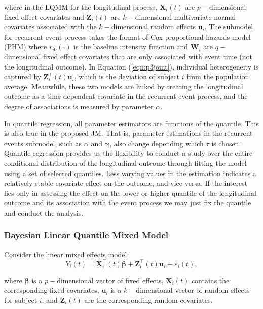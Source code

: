 \noindent where in the LQMM for the longitudinal process, $\boldsymbol{X}_{i}(t)$ are $p-$dimensional fixed effect covariates and $\boldsymbol{Z}_{i}(t)$ are $k-$dimensional multivariate normal covariates associated with the $k-$dimensional random effects $\boldsymbol{u}_i$. The submodel for recurrent event process takes the format of Cox proportional hazards model (PHM) where $r_{i0}(\cdot)$ is the baseline intensity function and $\boldsymbol{W}_{i}$ are $q-$dimensional fixed effect covariates that are only associated with event time (not the longitudinal outcome). In Equation (\ref{eqn:p3joint}), individual heterogeneity is captured by ${\boldsymbol Z}_{i}^{\top}(t){\boldsymbol u}_i$, which is the deviation of subject $i$ from the population average. Meanwhile, these two models are linked by treating the longitudinal outcome as a time dependent covariate in the recurrent event process, and the degree of associations is measured by parameter $\alpha$.

In quantile regression, all parameter estimators are functions of the quantile. This is also true in the proposed JM. That is, parameter estimations in the recurrent events submodel, such as $\alpha$ and $\boldsymbol{\gamma}$, also change depending which $\tau$ is chosen. Quantile regression provides us the flexibility to conduct a study over the entire conditional distribution of the longitudinal outcome through fitting the model using a set of selected quantiles. Less varying values in the estimation indicates a relatively stable covariate effect on the outcome, and vice versa. If the interest lies only in assessing the effect on the lower or higher quantile of the longitudinal outcome and its association with the event process we may just fix the quantile and conduct the analysis.


\subsubsection{Bayesian Linear Quantile Mixed Model}\label{sec:p3BLQMM}
Consider the linear mixed effects model:
\begin{equation}\label{eqn:p3lmm}
Y_{i}(t) ={\boldsymbol X}_{i}^{\top}(t) \boldsymbol{\beta}+ {\boldsymbol Z}_{i}^{\top}(t)\boldsymbol{u}_i + \varepsilon_{i}(t),
\end{equation}

\noindent where $\boldsymbol{\beta}$ is a $p-$dimensional vector of fixed effects,  ${\boldsymbol X}_{i}(t)$ contains the corresponding fixed covariates, $\boldsymbol{u}_i$ is a $k-$dimensional vector of random effects for subject $i$, and ${\boldsymbol Z}_{i}(t)$ are the corresponding random covariates.

